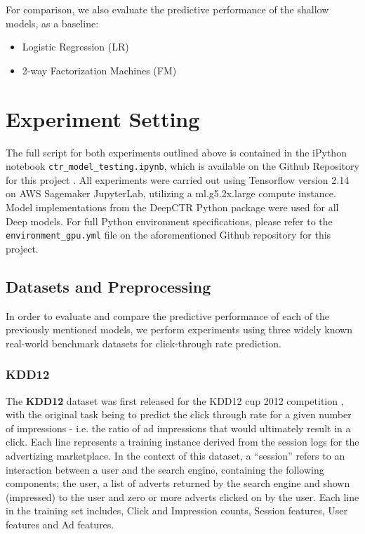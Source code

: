 \documentclass{mldsmsc}
\begin{document}
For comparison, we also evaluate the predictive performance of the shallow models, 
as a baseline:

\begin{itemize}
    \item Logistic Regression (LR) \citep{RefWorks:richardson2007predicting}
    \item 2-way Factorization Machines (FM) \citep{RefWorks:rendle2010factorization}
\end{itemize}

\section{Experiment Setting}
\label{sec:experiment-setup}

The full script for both experiments outlined above is contained in the iPython notebook
\verb|ctr_model_testing.ipynb|, which is available on the Github Repository for this project \citep{Batek_Deep_Reinforcement_Leaning_2024}.
All experiments were carried out using Tensorflow version 2.14 on AWS Sagemaker JupyterLab, utilizing a ml.g5.2x.large compute instance.
Model implementations from the DeepCTR Python package \citep{RefWorks:shen2017deepctr:} were
used for all Deep models. For full Python environment specifications, please refer to the
\verb|environment_gpu.yml| file on the aforementioned Github repository for this project.

\subsection{Datasets and Preprocessing}
\label{sec:datasets-preprocessing}

In order to evaluate and compare the predictive performance of each of the previously mentioned
models, we perform experiments using three widely known real-world benchmark datasets for
click-through rate prediction.

\subsubsection{KDD12}

The \textbf{KDD12} dataset was first released for the KDD12 cup 2012 competition
\citep{RefWorks:aden2012kdd}, with the original task being to predict the 
click through rate for a given number of impressions - i.e. the ratio of ad impressions
that would ultimately result in a click. Each line represents 
a training instance derived from the session logs for the advertizing 
marketplace. In the context of this dataset, a ``session'' refers to an 
interaction between a user and the search engine, containing the following 
components; the user, a list of adverts returned by the search engine and 
shown (impressed) to the user and zero or more adverts clicked on by the 
user. Each line in the training set includes, Click and Impression counts, 
Session features, User features and Ad features.
\end{document}

